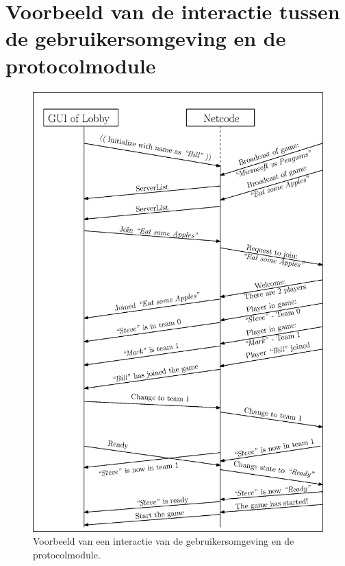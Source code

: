 \documentclass[a4paper,11pt]{article}
\begin{document}
    \section{Voorbeeld van de interactie tussen de gebruikersomgeving en de protocolmodule}
    \label{sec:interactscenmodel}
    \begin{figure}[h]
    	\centering
	\includegraphics[height=0.7\textheight]{../Class-diagram/MSCLobby-console.eps}
	\caption{Voorbeeld van een interactie van de gebruikersomgeving en de protocolmodule.}
    \end{figure}
    \label{app:MSCLobbyCon}
    
\end{document}
